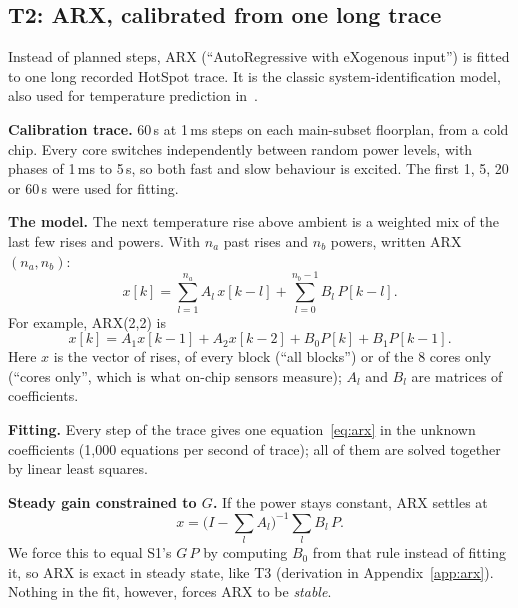 \documentclass[11pt,a4paper]{article}
\begin{document}
\subsection{T2: ARX, calibrated from one long trace}\label{sec:arx}
Instead of planned steps, ARX (``AutoRegressive with eXogenous input'') is fitted to one long
recorded HotSpot trace. It is the classic system-identification model, also used for temperature
prediction in~\cite{coskun09,singla15}.

\textbf{Calibration trace.} 60\,s at 1\,ms steps on each main-subset floorplan, from a cold chip.
Every core switches independently between random power levels, with phases of 1\,ms to 5\,s, so
both fast and slow behaviour is excited. The first 1, 5, 20 or 60\,s were used for fitting.

\textbf{The model.} The next temperature rise above ambient is a weighted mix of the last few rises
and powers. With $n_a$ past rises and $n_b$ powers, written ARX$(n_a, n_b)$:
\begin{equation}
  x[k] = \sum_{l=1}^{n_a} A_l\, x[k-l] + \sum_{l=0}^{n_b-1} B_l\, P[k-l].
  \label{eq:arx}
\end{equation}
For example, ARX(2,2) is
\[
  x[k] = A_1 x[k-1] + A_2 x[k-2] + B_0 P[k] + B_1 P[k-1].
\]
Here $x$ is the vector of rises, of every block (``all blocks'') or of the 8 cores only (``cores
only'', which is what on-chip sensors measure); $A_l$ and $B_l$ are matrices of coefficients.

\textbf{Fitting.} Every step of the trace gives one equation~\eqref{eq:arx} in the unknown
coefficients (1{,}000 equations per second of trace); all of them are solved together by linear
least squares.

\textbf{Steady gain constrained to $G$.} If the power stays constant, ARX settles at
\[
  x = \Big(I - \sum_l A_l\Big)^{-1} \sum_l B_l\, P.
\]
We force this to equal S1's $G\,P$ by computing $B_0$ from that rule instead of fitting it, so ARX
is exact in steady state, like T3 (derivation in Appendix~\ref{app:arx}). Nothing in the fit,
however, forces ARX to be \emph{stable}.
\end{document}
